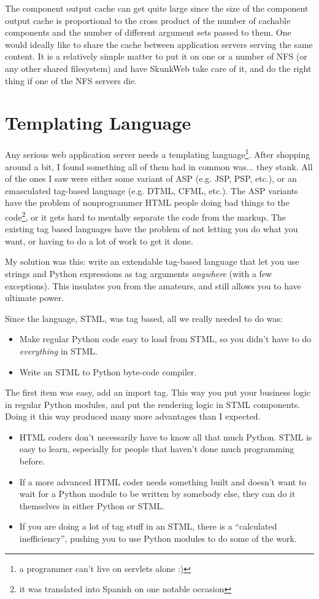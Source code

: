\documentclass[twocolumn]{article}
\begin{document}
The component output cache can get quite large since the size of the
component output cache is proportional to the cross product of the
number of cachable components and the number of different argument
sets passed to them. One would ideally like to share the cache between
application servers serving the same content.  It is a relatively
simple matter to put it on one or a number of NFS (or any other shared
filesystem) and have SkunkWeb take care of it, and do the right thing
if one of the NFS servers die.
 
\section{Templating Language}
Any serious web application server needs a templating
language\footnote{a programmer can't live on servlets alone :)}.
After shopping around a bit, I found something all of them had in
common was... they stank.  All of the ones I saw were either some
variant of ASP\cite{asp} (e.g. JSP\cite{jsp}, PSP\cite{psp}, etc.), or
an emasculated tag-based language (e.g. DTML\cite{dtml},
CFML\cite{cfml}, etc.).  The ASP variants have the problem of
nonprogrammer HTML people doing bad things to the
code\footnote{it was translated into Spanish on one notable occasion},
or it gets hard to mentally separate the code from the markup.
The existing tag based languages have the problem of not 
letting you do what you want, or having to do a lot of work to get it
done.

My solution was this: write an extendable tag-based language that let
you use strings and Python expressions as tag arguments
\emph{anywhere} (with a few exceptions).  This insulates you from the
amateurs, and still allows you to have ultimate power.

Since the language, STML, was tag based, all we really needed to do
was:
\begin{itemize}
\item Make regular Python code easy to load from STML, so you didn't
have to do \emph{everything} in STML.
\item Write an STML to Python byte-code compiler.
\end{itemize}

The first item was easy, add an import tag.  This way you put your
business logic in regular Python modules, and put the rendering logic
in STML components.  Doing it this way produced many more advantages
than I expected.
\begin{itemize}
\item HTML coders don't necessarily have to know all that much Python.
STML is easy to learn, especially for people that haven't
done much programming before.
\item If a more advanced HTML coder needs something built and doesn't want
to wait for a Python module to be written by somebody else, they can
do it themselves in either Python or STML.
\item If you are doing a lot of tag stuff in an STML, there is a
``calculated inefficiency'', pushing you to use Python modules to do
some of the work.
\end{itemize}
\end{document}
